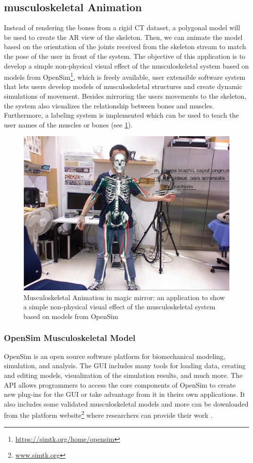 \subsection{musculoskeletal Animation} \label{sec:3-IMR:musculoskeletal}
Instead of rendering the bones from a rigid CT dataset, a polygonal model will be used to create the AR view of the skeleton. Then, we can animate the model based on the orientation of the joints received from the skeleton stream to match the pose of the user in front of the system.
The objective of this application is to develop a simple non-physical visual effect of the musculoskeletal system based on models from OpenSim\footnote{\url{https://simtk.org/home/opensim}}, which is freely available, user extensible software system that lets users develop models of musculoskeletal structures and create dynamic simulations of movement. Besides mirroring the users movements to the skeleton, the system also visualizes the relationship between bones and muscles. Furthermore, a labeling system is implemented which can be used to teach the user names of the muscles or bones (see \figurename{\ref{fig:3-IMR:skeletonMuscleDemo}}).

\begin{figure}
	\centering
	\includegraphics[width=0.7\linewidth]{figures/3-IMR/skeleton_Muscle2.png}
	\caption{Musculoskeletal Animation in magic mirror: an application to show a simple non-physical visual effect of the musculoskeletal system based on models from OpenSim}
	\label{fig:3-IMR:skeletonMuscleDemo}
\end{figure}

\subsubsection{OpenSim Musculoskeletal Model}
OpenSim is an open source software platform for biomechanical modeling, simulation, and analysis. The GUI includes many tools for loading data, creating and editing models, visualization of the simulation results, and much more. The API allows programmers to access the core components of OpenSim to create new plug-ins for the GUI or take advantage from it in theirs own applications. It also includes some validated musculoskeletal models and more can be downloaded from the platform website\footnote{\url{www.simtk.org}} where researchers can provide their work \cite{Delp2007}.

